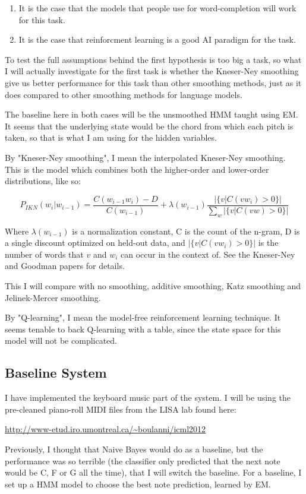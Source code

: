 \documentclass{article}
\begin{document}
\begin{enumerate}
    \item It is the case that the models that people use for word-completion will work for this task.
    \item It is the case that reinforcment learning is a good AI paradigm for the task.
\end{enumerate}

To test the full assumptions behind the first hypothesis is too big a task, so what I will actually investigate for the first task is whether the Kneser-Ney smoothing give us better performance for this task than other smoothing methods, just as it does compared to other smoothing methods for language models.

The baseline here in both cases will be the unsmoothed HMM taught using EM. It seems that the underlying state would be the chord from which each pitch is taken, so that is what I am using for the hidden variables.

By "Kneser-Ney smoothing", I mean the interpolated Kneser-Ney smoothing. This is the model which combines both the higher-order and lower-order distributions, like so:

$$P_{IKN}(w_i | w_{i-1}) = \frac{C(w_{i-1}w_i) - D}{C(w_{i-1})} + \lambda (w_{i-1}) \frac{|\{v | C(vw_i) > 0 \}|}{\sum_w |\{v|C(vw) > 0\}|}$$

Where $\lambda(w_{i-1})$ is a normalization constant, C is the count of the n-gram, D is a single discount optimized on held-out data, and $|\{v|C(vw_i) > 0\}|$ is the number of words that $v$ and $w_i$ can occur in the context of. See the Kneser-Ney and Goodman papers for details.

This I will compare with no smoothing, additive smoothing, Katz smoothing and Jelinek-Mercer smoothing.

By "Q-learning", I mean the model-free reinforcement learning technique. It seems tenable to back Q-learning with a table, since the state space for this model will not be complicated.

\subsection*{Baseline System}
I have implemented the keyboard music part of the system. I will be using the pre-cleaned piano-roll MIDI files from the LISA lab found here:

\url{http://www-etud.iro.umontreal.ca/~boulanni/icml2012}

Previously, I thought that Naive Bayes would do as a baseline, but the performance was so terrible (the classifier only predicted that the next note would be C, F or G all the time), that I will switch the baseline. For a baseline, I set up a HMM model to choose the best note prediction, learned by EM.
\end{document}
